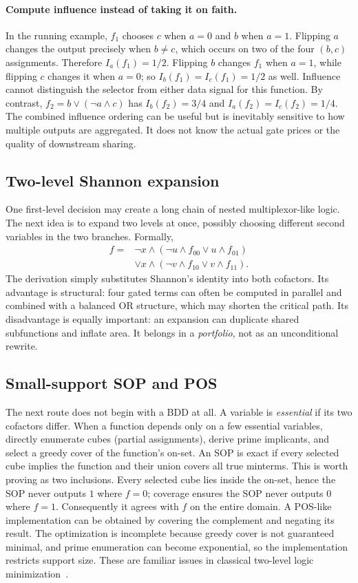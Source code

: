 \documentclass[a4paper,10pt]{article}
\theoremstyle{definition}
\theoremstyle{remark}
\begin{document}
\paragraph{Compute influence instead of taking it on faith.} In the running example, $f_1$ chooses $c$ when $a=0$ and $b$ when $a=1$. Flipping $a$ changes the output precisely when $b\ne c$, which occurs on two of the four $(b,c)$ assignments. Therefore $I_a(f_1)=1/2$. Flipping $b$ changes $f_1$ when $a=1$, while flipping $c$ changes it when $a=0$; so $I_b(f_1)=I_c(f_1)=1/2$ as well. Influence cannot distinguish the selector from either data signal for this function. By contrast, $f_2=b\lor(\neg a\land c)$ has $I_b(f_2)=3/4$ and $I_a(f_2)=I_c(f_2)=1/4$. The combined influence ordering can be useful but is inevitably sensitive to how multiple outputs are aggregated. It does not know the actual gate prices or the quality of downstream sharing.

\subsection{Two-level Shannon expansion}
One first-level decision may create a long chain of nested multiplexor-like logic. The next idea is to expand two levels at once, possibly choosing different second variables in the two branches. Formally,
\begin{align*}
 f={}&\neg x\land(\neg u\land f_{00}\lor u\land f_{01})\\
 &\lor x\land(\neg v\land f_{10}\lor v\land f_{11}).
\end{align*}
The derivation simply substitutes Shannon's identity into both cofactors. Its advantage is structural: four gated terms can often be computed in parallel and combined with a balanced OR structure, which may shorten the critical path. Its disadvantage is equally important: an expansion can duplicate shared subfunctions and inflate area. It belongs in a \emph{portfolio}, not as an unconditional rewrite.

\subsection{Small-support SOP and POS}
The next route does not begin with a BDD at all. A variable is \emph{essential} if its two cofactors differ. When a function depends only on a few essential variables, directly enumerate cubes (partial assignments), derive prime implicants, and select a greedy cover of the function's on-set. An SOP is exact if every selected cube implies the function and their union covers all true minterms. This is worth proving as two inclusions. Every selected cube lies inside the on-set, hence the SOP never outputs $1$ where $f=0$; coverage ensures the SOP never outputs $0$ where $f=1$. Consequently it agrees with $f$ on the entire domain. A POS-like implementation can be obtained by covering the complement and negating its result. The optimization is incomplete because greedy cover is not guaranteed minimal, and prime enumeration can become exponential, so the implementation restricts support size. These are familiar issues in classical two-level logic minimization~\cite{brayton1984}.
\end{document}
